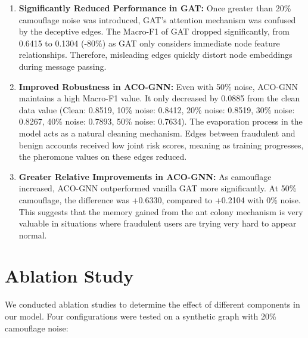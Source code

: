 \begin{enumerate}
    \item \textbf{Significantly Reduced Performance in GAT:} Once greater than 20\% camouflage noise was introduced, GAT's attention mechanism was confused by the deceptive edges. The Macro-F1 of GAT dropped significantly, from 0.6415 to 0.1304 (-80\%) as GAT only considers immediate node feature relationships. Therefore, misleading edges quickly distort node embeddings during message passing.
    
    \item \textbf{Improved Robustness in ACO-GNN:} Even with 50\% noise, ACO-GNN maintains a high Macro-F1 value. It only decreased by 0.0885 from the clean data value (Clean: 0.8519, 10\% noise: 0.8412, 20\% noise: 0.8519, 30\% noise: 0.8267, 40\% noise: 0.7893, 50\% noise: 0.7634). The evaporation process in the model acts as a natural cleaning mechanism. Edges between fraudulent and benign accounts received low joint risk scores, meaning as training progresses, the pheromone values on these edges reduced.
    
    \item \textbf{Greater Relative Improvements in ACO-GNN:} As camouflage increased, ACO-GNN outperformed vanilla GAT more significantly. At 50\% camouflage, the difference was +0.6330, compared to +0.2104 with 0\% noise. This suggests that the memory gained from the ant colony mechanism is very valuable in situations where fraudulent users are trying very hard to appear normal.
\end{enumerate}

\section[Ablation Study]{Ablation Study}
\label{sec:ablation}

We conducted ablation studies to determine the effect of different components in our model. Four configurations were tested on a synthetic graph with 20\% camouflage noise:

